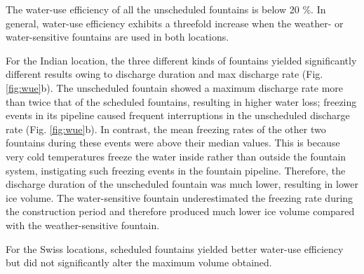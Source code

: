The water-use efficiency of all the unscheduled fountains is below 20 \%. In general, water-use efficiency
exhibits a threefold increase when the weather- or water-sensitive fountains are used in both
locations.

For the Indian location, the three different kinds of fountains yielded significantly different results owing to discharge
duration and max discharge rate
(Fig. \ref{fig:wue}b). The unscheduled fountain showed a maximum discharge rate more than twice that of
the scheduled fountains, resulting in higher water loss; freezing events in its pipeline caused frequent
interruptions in the unscheduled discharge rate (Fig. \ref{fig:wue}b). In contrast, the mean freezing
rates of the other two fountains during these events were above their median values. This is because very cold
temperatures freeze the water inside rather than outside the fountain system, instigating such freezing events in
the fountain pipeline. Therefore, the discharge duration of the unscheduled fountain was much lower, resulting in
lower ice volume. The water-sensitive fountain underestimated the freezing rate during the construction period
and therefore produced much lower ice volume compared with the weather-sensitive fountain.

For the Swiss locations, scheduled fountains yielded better water-use efficiency but did not significantly alter the maximum
volume obtained.

